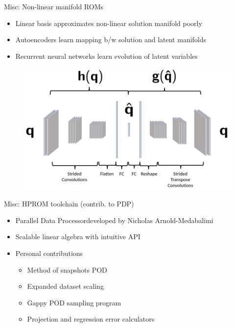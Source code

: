 \documentclass[]{beamer}
\begin{document}
\begin{frame}{Misc: Non-linear manifold ROMs\footnotemark[15]}
	\begin{itemize}
		\item Linear basis approximates non-linear solution manifold poorly
		\item Autoencoders learn mapping b/w solution and latent manifolds
		\item Recurrent neural networks learn evolution of latent variables
	\end{itemize}
	\vspace{2em}
	\begin{minipage}{0.49\linewidth}
		\begin{figure}
			\includegraphics[width=0.99\linewidth]{misc/CAE_dense.png}
		\end{figure}
	\end{minipage}
	\begin{minipage}{0.49\linewidth}
		\begin{figure}
		\end{figure}
	\end{minipage}
\end{frame}

\begin{frame}{Misc: HPROM toolchain (contrib. to PDP)}
	\begin{itemize}
		\item Parallel Data Processor\footnotemark[16] developed by Nicholas Arnold-Medabalimi
		\item Scalable linear algebra with intuitive API
		\item Personal contributions
		\begin{itemize}
			\item Method of snapshots POD
			\item Expanded dataset scaling
			\item Gappy POD sampling program
			\item Projection and regression error calculators
		\end{itemize}
	\end{itemize}
\end{frame}
\end{document}
